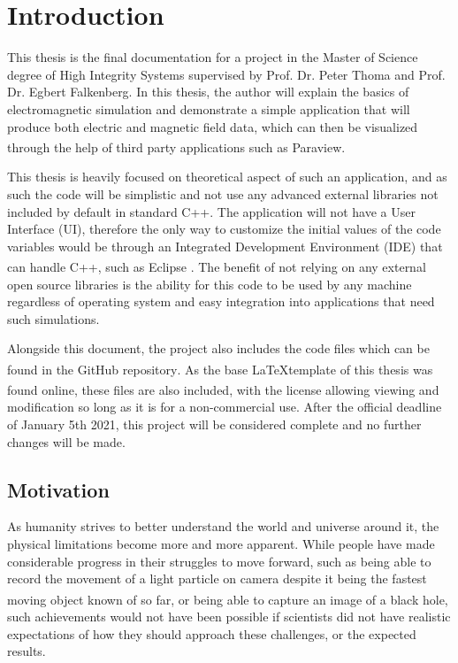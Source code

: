 
\chapter{Introduction} %

\label{Chapter1} %

This thesis is the final documentation for a project in the Master of Science degree of High Integrity Systems supervised by Prof. Dr. Peter Thoma and Prof. Dr. Egbert Falkenberg. In this thesis, the author will explain the basics of electromagnetic simulation and demonstrate a simple application that will produce both electric and magnetic field data, which can then be visualized through the help of third party applications such as Paraview\textsuperscript{\cite{paraview}}. 

This thesis is heavily focused on theoretical aspect of such an application, and as such the code will be simplistic and not use any advanced external libraries not included by default in standard C++. The application will not have a User Interface (UI), therefore the only way to customize the initial values of the code variables would be through an Integrated Development Environment (IDE) that can handle C++, such as Eclipse \textsuperscript{\cite{eclipse}}. The benefit of not relying on any external open source libraries is the ability for this code to be used by any machine regardless of operating system and easy integration into applications that need such simulations.

Alongside this document, the project also includes the code files which can be found in the GitHub repository\textsuperscript{\cite{robo}}. As the base \LaTeX \space template of this thesis was found online\textsuperscript{\cite{template}}, these files are also included, with the license allowing viewing and modification so long as it is for a non-commercial use. After the official deadline of January 5th 2021, this project will be considered complete and no further changes will be made.

\section{Motivation}

As humanity strives to better understand the world and universe around it, the physical limitations become more and more apparent. While people have made considerable progress in their struggles to move forward, such as being able to record the movement of a light particle on camera despite it being the fastest moving object known of so far\textsuperscript{\cite{velten2013femto}}, or being able to capture an image of a black hole\textsuperscript{\cite{landau_2019}}, such achievements would not have been possible if scientists did not have realistic expectations of how they should approach these challenges, or the expected results. 

